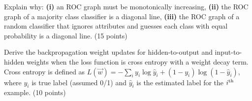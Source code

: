 \documentclass[fleqn]{homework}
\begin{document}
  \begin{problem}{4}
    \begin{question}
      Explain why: \textbf{(i)} an ROC graph must be monotonically increasing,
      \textbf{(ii)} the ROC graph of a majority class classifier is a diagonal
      line, \textbf{(iii)} the ROC graph of a random classifier that ignores
      attributes and guesses each class with equal probability is a diagonal
      line. (15 points)
    \end{question}
  \end{problem}

  \begin{problem}{5}
    \begin{question}
      Derive the backpropagation weight updates for hidden-to-output and
      input-to-hidden weights when the loss function is cross entropy with a
      weight decay term.  Cross entropy is defined as
      $L(\vec{w}) = -\sum_i y_i \log \hat{y}_i + (1-y_i)\log(1-\hat{y}_i)$,
      where $y_i$ is true label (assumed 0/1) and $\hat{y}_i$ is the estimated
      label for the $i\textsuperscript{th}$ example. (10 points)
    \end{question}
  \end{problem}
\end{document}
